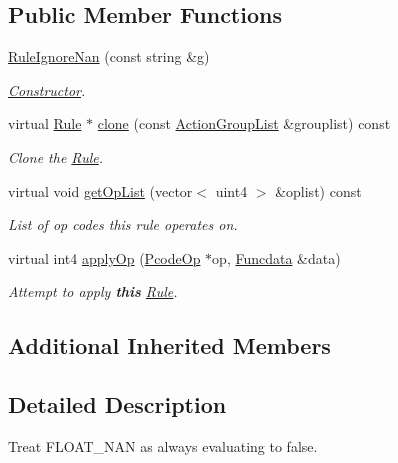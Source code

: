 \subsection*{Public Member Functions}
\begin{DoxyCompactItemize}
\item 
\mbox{\hyperlink{class_rule_ignore_nan_a9a8949fd2e8ceac2647f741070489bde}{Rule\+Ignore\+Nan}} (const string \&g)
\begin{DoxyCompactList}\small\item\em \mbox{\hyperlink{class_constructor}{Constructor}}. \end{DoxyCompactList}\item 
virtual \mbox{\hyperlink{class_rule}{Rule}} $\ast$ \mbox{\hyperlink{class_rule_ignore_nan_a6ab45fb568de88034a821f0679a5c91e}{clone}} (const \mbox{\hyperlink{class_action_group_list}{Action\+Group\+List}} \&grouplist) const
\begin{DoxyCompactList}\small\item\em Clone the \mbox{\hyperlink{class_rule}{Rule}}. \end{DoxyCompactList}\item 
virtual void \mbox{\hyperlink{class_rule_ignore_nan_a89bc86380b20ccfddd6dadd4e088b086}{get\+Op\+List}} (vector$<$ uint4 $>$ \&oplist) const
\begin{DoxyCompactList}\small\item\em List of op codes this rule operates on. \end{DoxyCompactList}\item 
virtual int4 \mbox{\hyperlink{class_rule_ignore_nan_afd2b8e067067db3127664cd2cedfd092}{apply\+Op}} (\mbox{\hyperlink{class_pcode_op}{Pcode\+Op}} $\ast$op, \mbox{\hyperlink{class_funcdata}{Funcdata}} \&data)
\begin{DoxyCompactList}\small\item\em Attempt to apply {\bfseries{this}} \mbox{\hyperlink{class_rule}{Rule}}. \end{DoxyCompactList}\end{DoxyCompactItemize}
\subsection*{Additional Inherited Members}


\subsection{Detailed Description}
Treat F\+L\+O\+A\+T\+\_\+\+N\+AN as always evaluating to false. 

